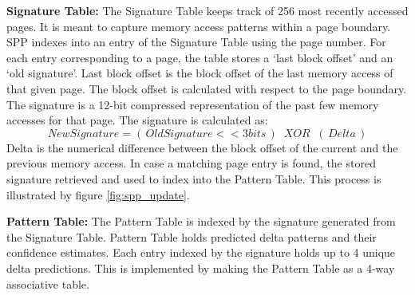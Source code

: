 
\textbf{Signature Table:} The Signature Table keeps track of 256 most recently accessed
pages.  It is meant to capture memory access patterns within a page
boundary.  SPP indexes into an entry of the Signature Table using the page number.  For
each entry corresponding to a page, the table stores a `last block offset'
and an `old signature'.  Last block offset is the block offset of the
last memory access of that given page.  The block offset is calculated
with respect to the page boundary.  The signature is a 12-bit
compressed representation of the past few memory accesses for that
page.  The signature is calculated as:
$$New Signature = (\,Old Signature << 3 bits\,) \;\;XOR\;\; (\,Delta\,)$$ 
Delta is the numerical difference between the block offset of the 
current and the previous memory access. In case a matching page entry 
is found, the stored signature retrieved and used to index into the 
Pattern Table. This process is illustrated by figure \ref{fig:spp_update}.

\textbf{Pattern Table:} The Pattern Table is indexed by the signature generated
from the Signature Table.  Pattern Table holds predicted delta patterns and their confidence
estimates.  Each entry indexed by the signature holds up to 4 unique
delta predictions.  This is implemented by making the Pattern Table as a 4-way
associative table.



